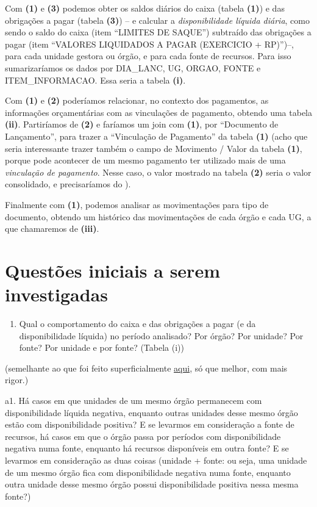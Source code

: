 \documentclass[]{book}
\providecommand{\tightlist}{%
  \setlength{\itemsep}{0pt}\setlength{\parskip}{0pt}}
\begin{document}
Com \textbf{(1)} e \textbf{(3)} podemos obter os saldos diários do caixa (tabela \textbf{(1)}) e das obrigações a pagar (tabela \textbf{(3)}) -- e calcular a \emph{disponibilidade líquida diária}, como sendo o saldo do caixa (item ``LIMITES DE SAQUE'') subtraído das obrigações a pagar (item ``VALORES LIQUIDADOS A PAGAR (EXERCICIO + RP)'')--, para cada unidade gestora ou órgão, e para cada fonte de recursos. Para isso sumarizaríamos os dados por DIA\_LANC, UG, ORGAO, FONTE e ITEM\_INFORMACAO. Essa seria a tabela \textbf{(i)}.

Com \textbf{(1)} e \textbf{(2)} poderíamos relacionar, no contexto dos pagamentos, as informações orçamentárias com as vinculações de pagamento, obtendo uma tabela \textbf{(ii)}. Partiríamos de \textbf{(2)} e faríamos um join com \textbf{(1)}, por ``Documento de Lançamento'', para trazer a ``Vinculação de Pagamento'' da tabela \textbf{(1)} (acho que seria interessante trazer também o campo de Movimento / Valor da tabela \textbf{(1)}, porque pode acontecer de um mesmo pagamento ter utilizado mais de uma \emph{vinculação de pagamento}. Nesse caso, o valor mostrado na tabela \textbf{(2)} seria o valor consolidado, e precisaríamos do ).

Finalmente com \textbf{(1)}, podemos analisar as movimentações para tipo de documento, obtendo um histórico das movimentações de cada órgão e cada UG, a que chamaremos de \textbf{(iii)}.

\hypertarget{questuxf5es-iniciais-a-serem-investigadas}{%
\section{Questões iniciais a serem investigadas}\label{questuxf5es-iniciais-a-serem-investigadas}}

\begin{enumerate}
\def\labelenumi{\alph{enumi}.}
\tightlist
\item
  Qual o comportamento do caixa e das obrigações a pagar (e da disponibilidade líquida) no período analisado? Por órgão? Por unidade? Por fonte? Por unidade e por fonte? (Tabela (i))
\end{enumerate}

(semelhante ao que foi feito superficialmente \href{https://github.com/TesouroNacional/puddles-puddles}{aqui}, só que melhor, com mais rigor.)

a1. Há casos em que unidades de um mesmo órgão permanecem com disponibilidade líquida negativa, enquanto outras unidades desse mesmo órgão estão com disponibilidade positiva? E se levarmos em consideração a fonte de recursos, há casos em que o órgão passa por períodos com disponibilidade negativa numa fonte, enquanto há recursos disponíveis em outra fonte? E se levarmos em consideração as duas coisas (unidade + fonte: ou seja, uma unidade de um mesmo órgão fica com disponibilidade negativa numa fonte, enquanto outra unidade desse mesmo órgão possui disponibilidade positiva nessa mesma fonte?)
\end{document}
